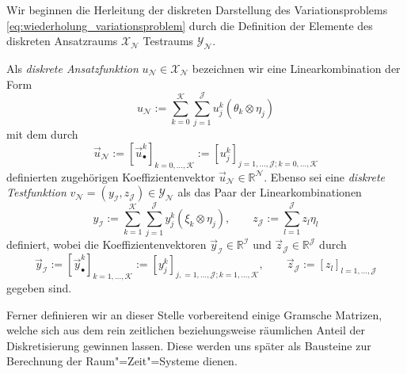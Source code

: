 \documentclass[../main.tex]{subfiles}
\begin{document}
Wir beginnen die Herleitung der diskreten Darstellung des Variationsproblems \cref{eq:wiederholung_variationsproblem} durch die Definition der Elemente des diskreten Ansatzraums $\mathcal X_{\mathcal N}$ Testraums $\mathcal Y_{\mathcal N}$.

\begin{Definition}
\label{definition:diskrete_ansatz_und_testfunktionen}
    Als \emph{diskrete Ansatzfunktion} $u_{\mathcal N} \in \mathcal X_{\mathcal N}$ bezeichnen wir eine Linearkombination der Form
    \begin{equation}
    \label{eq:darstellung_diskrete_ansatzfunktion}
        u_{\mathcal N} := \sum_{k = 0}^{\mathcal K} \sum_{j = 1}^{\mathcal J} u_{j}^{k} (\theta_{k} \otimes \eta_{j})
    \end{equation}
    mit dem durch
    \begin{equation}
        \vec{u}_{\mathcal N} := [\vec{u}^{k}_{\bullet}]_{k = 0, \dots, \mathcal K} := [ u^{k}_{j} ]_{j = 1, \dots, \mathcal J;k = 0, \dots, \mathcal K}
    \end{equation}
    definierten zugehörigen Koeffizientenvektor $\vec{u}_{\mathcal N} \in \mathbb{R}^{\mathcal N}$.
    Ebenso sei eine \emph{diskrete Testfunktion} $v_{\mathcal N} = (y_{\mathcal I}, z_{\mathcal J}) \in \mathcal Y_{\mathcal N}$ als das Paar der Linearkombinationen
    \begin{equation}
    \label{eq:darstellung_diskrete_testfunktion}
        y_{\mathcal I} := \sum_{k = 1}^{\mathcal K} \sum_{j = 1}^{\mathcal J} y_{j}^{k} (\xi_{k} \otimes \eta_{j}), \qquad
        z_{\mathcal J} := \sum_{l = 1}^{\mathcal J} z_{l} \eta_{l}
    \end{equation}
    definiert,
    wobei die Koeffizientenvektoren $\vec{y}_{\mathcal I} \in \mathbb{R}^{\mathcal I}$ und $\vec{z}_{\mathcal J} \in \mathbb{R}^{\mathcal J}$ durch
    \begin{equation}
        \vec{y}_{\mathcal I} := [\vec{y}^{k}_{\bullet}]_{k = 1, \dots, \mathcal K} := [y^{k}_{j}]_{j, = 1, \dots, \mathcal J; k = 1, \dots, \mathcal K}, \qquad
        \vec{z}_{\mathcal J} := [z_{l}]_{l = 1, \dots, \mathcal J}
    \end{equation}
    gegeben sind.
\end{Definition}

Ferner definieren wir an dieser Stelle vorbereitend einige Gramsche Matrizen, welche sich aus dem rein zeitlichen beziehungsweise räumlichen Anteil der Diskretisierung gewinnen lassen.
Diese werden uns später als Bausteine zur Berechnung der Raum"=Zeit"=Systeme dienen.
\end{document}
